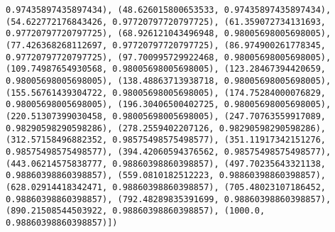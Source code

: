 \documentclass[11pt]{article}
\begin{document}
\begin{Verbatim}[commandchars=\\\{\}]
0.97435897435897434), (48.626015800653533, 0.97435897435897434), (54.622772176843426, 0.97720797720797725), (61.359072734131693, 0.97720797720797725), (68.926121043496948, 0.98005698005698005), (77.426368268112697, 0.97720797720797725), (86.974900261778345, 0.97720797720797725), (97.700995729922468, 0.98005698005698005), (109.74987654930568, 0.98005698005698005), (123.28467394420659, 0.98005698005698005), (138.48863713938718, 0.98005698005698005), (155.56761439304722, 0.98005698005698005), (174.75284000076829, 0.98005698005698005), (196.30406500402725, 0.98005698005698005), (220.51307399030458, 0.98005698005698005), (247.70763559917089, 0.98290598290598286), (278.2559402207126, 0.98290598290598286), (312.57158496882352, 0.98575498575498577), (351.11917342151276, 0.98575498575498577), (394.42060594376562, 0.98575498575498577), (443.06214575838777, 0.98860398860398857), (497.70235643321138, 0.98860398860398857), (559.0810182512223, 0.98860398860398857), (628.02914418342471, 0.98860398860398857), (705.48023107186452, 0.98860398860398857), (792.48289835391699, 0.98860398860398857), (890.21508544503922, 0.98860398860398857), (1000.0, 0.98860398860398857)])

\end{Verbatim}
\end{document}
